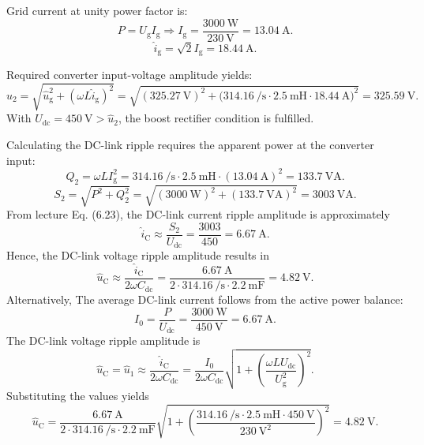 \begin{solutionblock}
	Grid current at unity power factor is:
	$$P=U_\mathrm{g} I_\mathrm{g} \Rightarrow I_\mathrm{g}=\frac{\SI{3000}{\watt}}{\SI{230}{\volt}}=\SI{13.04}{\ampere}.$$
	$$\hat{i}_\mathrm{g}=\sqrt{2}I_\mathrm{g}=\SI{18.44}{\ampere}. $$
\end{solutionblock}
\begin{solutionblock}
	Required converter input-voltage amplitude yields:
	$$\hat{u}_2=\sqrt{\hat{u}_\mathrm{g}^2+(\omega L\hat{i}_\mathrm{g})^2}
		=\sqrt{(\SI{325.27}{\volt})^2+\bigl(\SI{314.16}{\per\second}\cdot\SI{2.5}{\milli\henry}\cdot\SI{18.44}{\ampere}\bigr)^2}
		=\SI{325.59}{\volt}. $$
	With $U_{\mathrm{dc}}=\SI{450}{\volt}>\hat{u}_2$, the boost rectifier condition is fulfilled.
\end{solutionblock}
\begin{solutionblock}
	Calculating the DC-link ripple requires the apparent power at the converter input:
	$$Q_2=\omega L I_\mathrm{g}^2=\SI{314.16}{\per\second}\cdot\SI{2.5}{\milli\henry}\cdot(\SI{13.04}{\ampere})^2=\SI{133.7}{\volt\ampere}.$$
	$$S_2=\sqrt{P^2+Q_2^2}=\sqrt{(\SI{3000}{\watt})^2+(\SI{133.7}{\volt\ampere})^2}=\SI{3003}{\volt\ampere}. $$
	From lecture Eq. (6.23), the DC-link current ripple amplitude is approximately
	$$\hat{i}_\mathrm{C}\approx\frac{S_2}{U_\mathrm{dc}}=\frac{3003}{450}=\SI{6.67}{\ampere}. $$
	Hence, the DC-link voltage ripple amplitude results in
	$$\hat{u}_\mathrm{C}\approx\frac{\hat{i}_\mathrm{C}}{2\omega C_\mathrm{dc}}=\frac{\SI{6.67}{\ampere}}{2\cdot\SI{314.16}{\per\second}\cdot\SI{2.2}{\milli\farad}}=\SI{4.82}{\volt}.$$
	Alternatively,
	The average DC-link current follows from the active power balance:
	$$I_{0}=\frac{P}{U_\mathrm{dc}}=\frac{\SI{3000}{\watt}}{\SI{450}{\volt}}=\SI{6.67}{\ampere}. $$
	The DC-link voltage ripple amplitude is
	$$\hat{u}_\mathrm{C} = \hat{u}_1 \approx \frac{\hat{i}_\mathrm{C}}{2\omega C_\mathrm{dc}} = \frac{I_0}{2\omega C_\mathrm{dc}}\sqrt{1 + \left(\frac{\omega L U_\mathrm{dc}}{U^2_\mathrm{g}}\right)^2}.$$
	Substituting the values yields
	$$\hat{u}_\mathrm{C} = \frac{\SI{6.67}{\ampere}}{2\cdot\SI{314.16}{\per\second}\cdot\SI{2.2}{\milli\farad}}\sqrt{1 + \left(\frac{\SI{314.16}{\per\second}\cdot\SI{2.5}{\milli\henry}\cdot\SI{450}{\volt}}{\SI{230}{\volt}^2}\right)^2}=\SI{4.82}{\volt}.$$

\end{solutionblock}
